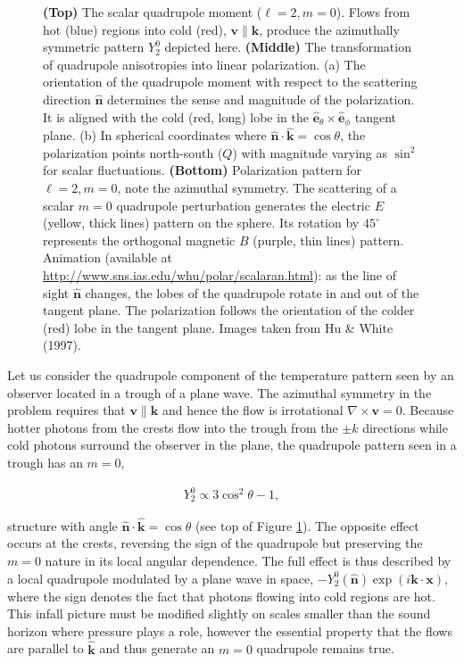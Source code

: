 \documentclass[a4paper,10pt]{article}
\begin{document}
\begin{figure}[t!]
\caption{\footnotesize{\textbf{(Top)} The scalar quadrupole moment ($\ell=2,m=0$). Flows from hot (blue) regions into cold (red), $\bm{v}\parallel\bm{k}$, produce the azimuthally symmetric pattern $Y_2^0$ depicted here. \textbf{(Middle)} The transformation of quadrupole anisotropies into linear polarization. (a) The orientation of the quadrupole moment with respect to the scattering direction $\bm{\hat{n}}$ determines the sense and magnitude of the polarization. It is aligned with the cold (red, long) lobe in the $\bm{\hat{e}}_\theta\times\bm{\hat{e}}_\phi$ tangent plane. (b) In spherical coordinates where $\bm{\hat{n}}\cdot\bm{\hat{k}}=\cos\theta$, the polarization points north-south ($Q$) with magnitude varying as $\sin^2$ for scalar fluctuations. \textbf{(Bottom)} Polarization pattern for $\ell=2,m=0$, note the azimuthal symmetry. The scattering of a scalar $m=0$ quadrupole perturbation generates the electric $E$ (yellow, thick lines) pattern on the sphere. Its rotation by $45^\circ$ represents the orthogonal magnetic $B$ (purple, thin lines) pattern. Animation (available at \href{http://www.sns.ias.edu/whu/polar/scalaran.html}{http://www.sns.ias.edu/whu/polar/scalaran.html}): as the line of sight $\bm{\hat{n}}$ changes, the lobes of the quadrupole rotate in and out of the tangent plane. The polarization follows the orientation of the colder (red) lobe in the tangent plane. Images taken from Hu \& White (1997).}}
\label{fig:scalar}
\end{figure}

{\noindent}Let us consider the quadrupole component of the temperature pattern seen by an observer located in a trough of a plane wave. The azimuthal symmetry in the problem requires that $\bm{v}\parallel\bm{k}$ and hence the flow is irrotational $\nabla\times\bm{v}=0$. Because hotter photons from the crests flow into the trough from the $\pm k$ directions while cold photons surround the observer in the plane, the quadrupole pattern seen in a trough has an $m = 0$,

\begin{align*}
    Y_2^0 \propto 3\cos^2\theta-1,
\end{align*}

{\noindent}structure with angle $\bm{\hat{n}\cdot\hat{k}}=\cos\theta$ (see top of Figure \ref{fig:scalar}). The opposite effect occurs at the crests, reversing the sign of the quadrupole but preserving the $m=0$ nature in its local angular dependence. The full effect is thus described by a local quadrupole modulated by a plane wave in space, $-Y_2^0(\bm{\hat{n}})\exp(i\bm{k}\cdot\bm{x})$, where the sign denotes the fact that photons flowing into cold regions are hot. This infall picture must be modified slightly on scales smaller than the sound horizon where pressure plays a role, however the essential property that the flows are parallel to $\bm{\hat{k}}$ and thus generate an $m=0$ quadrupole remains true.
\end{document}
